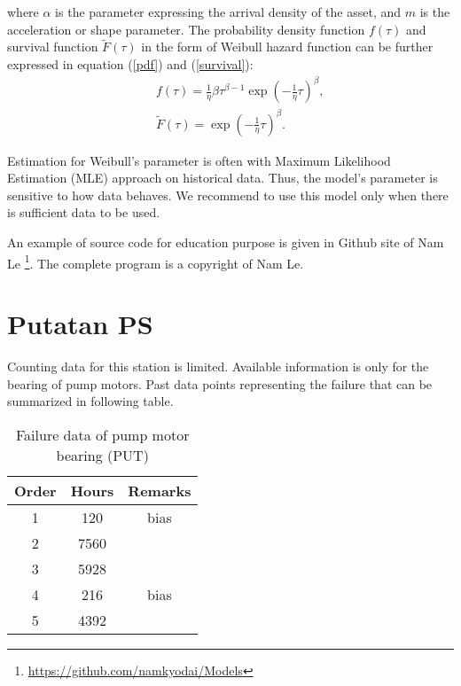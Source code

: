 \documentclass[fleqn]{article}
\begin{document}
where $\alpha$ is the parameter expressing the arrival density of the asset, and $m$ is the acceleration or shape parameter. The probability density function $f(\tau)$ and survival function $\tilde{F}(\tau)$ in the form of Weibull hazard function can be further expressed in equation (\ref{pdf}) and (\ref{survival}):
\begin{eqnarray}
&& f(\tau)=\frac{1}{\eta} \beta\tau^{\beta-1}\exp(-\frac{1}{\eta} \tau)^\beta, \label{pdf} \\
&& \tilde{F}(\tau)=\exp(-\frac{1}{\eta} \tau)^\beta. \label{survival}
\end{eqnarray}

Estimation for Weibull's parameter is often with Maximum Likelihood Estimation (MLE) approach on historical data. Thus, the model's parameter is sensitive to how data behaves. We recommend to use this model only when there is sufficient data to be used.

An example of source code for education purpose is given in Github site of Nam Le \footnote{\href{https://github.com/namkyodai/Models}{https://github.com/namkyodai/Models}}. The complete program is a copyright of Nam Le. 




\section{Putatan PS}
Counting data for this station is limited. Available information is only for the bearing of pump motors. Past data points representing the failure that can be summarized in following table.


\begin{table}[!htb]
	\centering
	\caption{Failure data of pump motor bearing (PUT)}
	\label{table_bearing_failure_bias}
	{\scriptsize
\begin{tabular}{c|c|c}
	\hline
	Order & Hours & Remarks \\ 
	\hline
	1 & 120 & bias \\ 
	2 & 7560 &  \\ 
	3 & 5928 &  \\ 
	4 & 216 & bias \\ 
	5 & 4392 &  \\ 
	\hline
\end{tabular}
		
	}%
\end{table}
\end{document}
